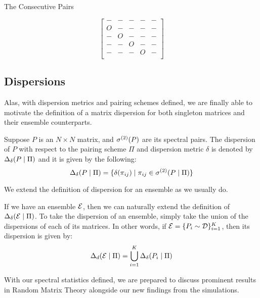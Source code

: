 The Consecutive Pairs 

$$
\begin{bmatrix}
- & - & - & - & -\\
O & - & - & - & -\\
- & O & - & - & -\\
- & - & O & - & -\\
- & - & - & O & -\\
\end{bmatrix}
$$

\newpage


\subsection{Dispersions}

Alas, with dispersion metrics and pairing schemes defined, we are finally able to motivate the definition of a matrix dispersion for both singleton matrices and their ensemble counterparts. 

\begin{definition}[Dispersion]
Suppose $P$ is an $N \times N$ matrix, and ${\sigma^{(2)}}(P)$ are its spectral pairs. The dispersion of $P$ with respect to the pairing scheme $\Pi$ and dispersion metric $\delta$ is denoted by $\Delta_\delta(P \mid \Pi)$ and it is given by the following:
$$\Delta_\delta(P \mid \Pi) = \{\delta({\pi_{ij}}) \mid {\pi_{ij}} \in {\sigma^{(2)}}(P \mid \Pi)\}$$
\end{definition}

We extend the definition of dispersion for an ensemble as we usually do.

\begin{definition}
If we have an ensemble $\mathcal{E}$, then we can naturally extend the definition of $\Delta_\delta(\mathcal{E} \mid \Pi)$. To take the dispersion of an ensemble, simply take the union of the dispersions of each of its matrices. In other words, if $\mathcal{E} = \{P_i \sim \mathcal{D}\}_{i = 1}^K$, then its dispersion is given by:
$$\Delta_d(\mathcal{E} \mid \Pi) = \bigcup_{i=1}^K \Delta_\delta(P_i \mid \Pi)$$
\end{definition}
With our spectral statistics defined, we are prepared to discuss prominent results in Random Matrix Theory alongside our new findings from the simulations. 


